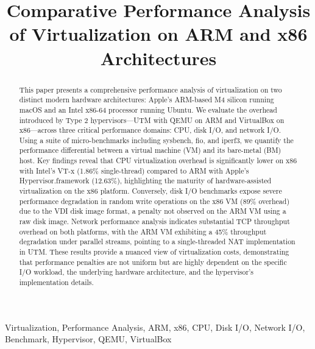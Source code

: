 \documentclass[conference]{IEEEtran}
\begin{document}
\title{Comparative Performance Analysis of Virtualization on ARM and x86 Architectures}

\author{
}

\maketitle

\begin{abstract}
This paper presents a comprehensive performance analysis of virtualization on two distinct modern hardware architectures: Apple's ARM-based M4 silicon running macOS and an Intel x86-64 processor running Ubuntu. We evaluate the overhead introduced by Type 2 hypervisors—UTM with QEMU on ARM and VirtualBox on x86—across three critical performance domains: CPU, disk I/O, and network I/O. Using a suite of micro-benchmarks including sysbench, fio, and iperf3, we quantify the performance differential between a virtual machine (VM) and its bare-metal (BM) host. Key findings reveal that CPU virtualization overhead is significantly lower on x86 with Intel's VT-x (1.86\% single-thread) compared to ARM with Apple's Hypervisor.framework (12.63\%), highlighting the maturity of hardware-assisted virtualization on the x86 platform. Conversely, disk I/O benchmarks expose severe performance degradation in random write operations on the x86 VM (89\% overhead) due to the VDI disk image format, a penalty not observed on the ARM VM using a raw disk image. Network performance analysis indicates substantial TCP throughput overhead on both platforms, with the ARM VM exhibiting a 45\% throughput degradation under parallel streams, pointing to a single-threaded NAT implementation in UTM. These results provide a nuanced view of virtualization costs, demonstrating that performance penalties are not uniform but are highly dependent on the specific I/O workload, the underlying hardware architecture, and the hypervisor's implementation details.
\end{abstract}

\begin{IEEEkeywords}
Virtualization, Performance Analysis, ARM, x86, CPU, Disk I/O, Network I/O, Benchmark, Hypervisor, QEMU, VirtualBox
\end{IEEEkeywords}
\end{document}
